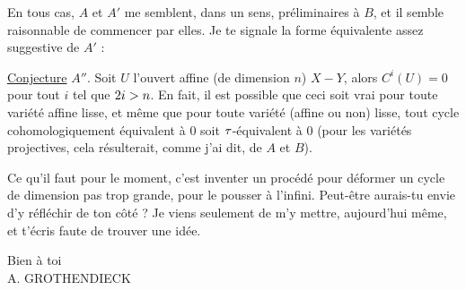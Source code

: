 En tous cas, $A$ et $A'$ me semblent, dans un sens, préliminaires à $B$, et il semble raisonnable de commencer par elles. Je te signale la forme équivalente assez suggestive de $A'$ :

\uline{Conjecture} $A''$. Soit $U$ l'ouvert affine (de dimension $n$) $X-Y$, alors $C^i(U)=0$ pour tout $i$ tel que $2i>n$.
En fait, il est possible que ceci soit vrai pour toute variété affine lisse, et même que pour toute variété (affine ou non) lisse, tout cycle cohomologiquement équivalent à $0$ soit $\tau$-équivalent à $0$ (pour les variétés projectives, cela résulterait, comme j'ai dit, de $A$ et $B$).

Ce qu'il faut pour le moment, c'est inventer un procédé pour déformer un cycle de dimension pas trop grande, pour le pousser à l'infini. Peut-être aurais-tu envie d'y réfléchir de ton côté ? Je viens seulement de m'y mettre, aujourd'hui même, et t'écris faute de trouver une idée.

Bien à toi\\
\hfill A. GROTHENDIECK\\

